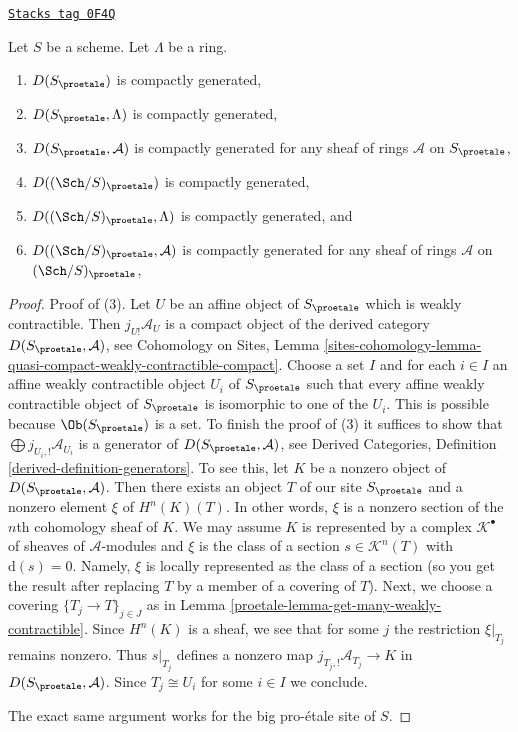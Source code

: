 \begin{lemma}
\label{proetale-lemma-enough-compact-proetale}
\href{https://stacks.math.columbia.edu/tag/0F4Q}{\texttt{Stacks tag 0F4Q}}

Let $S$ be a scheme. Let $\Lambda$ be a ring.
\begin{enumerate}
\item $D(S_\proetale)$ is compactly generated,
\item $D(S_\proetale, \Lambda)$ is compactly generated,
\item $D(S_\proetale, \mathcal{A})$ is compactly generated
for any sheaf of rings $\mathcal{A}$ on $S_\proetale$,
\item $D((\Sch/S)_\proetale)$ is compactly generated,
\item $D((\Sch/S)_\proetale, \Lambda)$ is compactly generated, and
\item $D((\Sch/S)_\proetale, \mathcal{A})$ is compactly generated
for any sheaf of rings $\mathcal{A}$ on $(\Sch/S)_\proetale$,
\end{enumerate}
\end{lemma}

\begin{proof}

Proof of (3). Let $U$ be an affine object of $S_\proetale$ which is
weakly contractible. Then $j_{U!}\mathcal{A}_U$ is a compact object
of the derived category $D(S_\proetale, \mathcal{A})$, see
Cohomology on Sites, Lemma
\ref{sites-cohomology-lemma-quasi-compact-weakly-contractible-compact}.
Choose a set $I$ and for each $i \in I$ an affine weakly contractible
object $U_i$ of $S_\proetale$ such that every affine weakly contractible
object of $S_\proetale$ is isomorphic to one of the $U_i$. This is possible
because $\Ob(S_\proetale)$ is a set. To finish the proof of (3) it suffices
to show that $\bigoplus j_{U_i, !}\mathcal{A}_{U_i}$ is a generator
of $D(S_\proetale, \mathcal{A})$, see
Derived Categories, Definition \ref{derived-definition-generators}.
To see this, let $K$ be a nonzero object
of $D(S_\proetale, \mathcal{A})$. Then there exists an object $T$
of our site $S_\proetale$ and a nonzero element $\xi$ of $H^n(K)(T)$.
In other words, $\xi$ is a nonzero section of the $n$th cohomology
sheaf of $K$.
We may assume $K$ is represented by a complex $\mathcal{K}^\bullet$
of sheaves of $\mathcal{A}$-modules and $\xi$ is the class of a
section $s \in \mathcal{K}^n(T)$ with $\text{d}(s) = 0$.
Namely, $\xi$ is locally represented as the class of a section
(so you get the result after replacing $T$ by a member of a covering of $T$).
Next, we choose a covering $\{T_j \to T\}_{j \in J}$
as in Lemma \ref{proetale-lemma-get-many-weakly-contractible}.
Since $H^n(K)$ is a sheaf, we see that for some $j$ the restriction
$\xi|_{T_j}$ remains nonzero. Thus $s|_{T_j}$ defines a nonzero map
$j_{T_j, !}\mathcal{A}_{T_j} \to K$ in $D(S_\proetale, \mathcal{A})$.
Since $T_j \cong U_i$ for some $i \in I$ we conclude.

\medskip\noindent
The exact same argument works for the big pro-\'etale site of $S$.
\end{proof}

